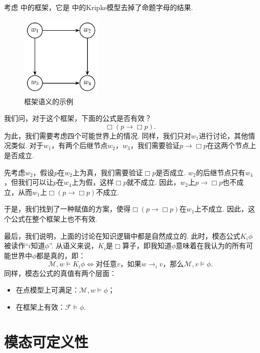 \begin{example}\label{ex:modal-logic-frame-validity}
考虑 中的框架，它是 中的Kripke模型去掉了命题字母的结果. 
\begin{figure}[ht]
\centering
\includegraphics[width=0.35\textwidth]{figures/modal-logic/frame-validity.pdf}
\caption{框架语义的示例} \label{fig:frame-validity}
\end{figure}

我们问，对于这个框架，下面的公式是否有效？
\[\Box (p\to\Box p).\]
为此，我们需要考虑四个可能世界上的情况. 同样，我们只对$w_1$进行讨论，其他情况类似. 对于$w_1$，有两个后继节点$w_2$，$w_3$，我们需要验证$p\to\Box p$在这两个节点上是否成立. 

先考虑$w_2$，假设$p$在$w_2$上为真，我们需要验证$\Box p$是否成立. $w_2$的后继节点只有$w_4$，但我们可以让$p$在$w_4$上为假，这样$\Box p$就不成立. 因此，$w_2$上$p\to\Box p$也不成立，从而$w_1$上$\Box (p\to\Box p)$不成立. 

于是，我们找到了一种赋值的方案，使得$\Box (p\to\Box p)$在$w_1$上不成立. 因此，这个公式在整个框架上也不有效. 
\end{example}


最后，我们说明，上面的讨论在知识逻辑中都是自然成立的. 此时，模态公式$K_i\phi$被读作“$i$知道$\phi$”. 从语义来说，$K_i$是$\Box$算子，即我知道$\phi$意味着在我认为的所有可能世界中$\phi$都是真的，即：
\[
\mathcal M,w\vDash K_i\phi\Longleftrightarrow\text{对任意$v$，如果$w\to_i v$，那么$\mathcal M,v\vDash\phi$}. 
\]
同样，模态公式的真值有两个层面：
\begin{itemize}
\item 在点模型上可满足：$\mathcal M,w\vDash\phi$；
\item 在框架上有效：$\mathcal F\vDash\phi$. 
\end{itemize}

\section{模态可定义性}\label{sec:modal-definability}

